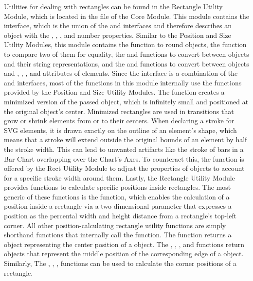 Utilities for dealing with rectangles can be found in the Rectangle
Utility Module, which is located in the  file
of the Core Module.  This module contains the  interface,
which is the union of the  and  interfaces
and therefore describes an object with the , ,
, and  number properties.  Similar to the
Position and Size Utility Modules, this module contains the
 function to round  objects, the
 function to compare two of them for equality, the
 and  functions to convert
between  objects and their string representations, and the
 and  functions to convert
between objects and , , , and
 attributes of elements.  Since the  interface
is a combination of the  and  interfaces,
most of the functions in this module internally use the functions
provided by the Position and Size Utility Modules.  The
 function creates a minimized version of the
passed  object, which is infinitely small and positioned at
the original  object's center.  Minimized rectangles are
used in transitions that grow or shrink  elements from or
to their centers.  When declaring a stroke for SVG elements, it is
drawn exactly on the outline of an element's shape, which means that a
stroke will extend outside the original bounds of an element by half
the stroke width.  This can lead to unwanted artifacts like the stroke
of bars in a Bar Chart overlapping over the Chart's Axes.  To
counteract this, the  function is offered by the
Rect Utility Module to adjust the properties of  objects to
account for a specific stroke width around them.  Lastly, the
Rectangle Utility Module provides functions to calculate specific
positions inside rectangles.  The most generic of these functions is
the  function, which enables the calculation of a
position inside a rectangle via a two-dimensional parameter that
expresses a position as the percental width and height distance from a
rectangle's top-left corner.  All other position-calculating rectangle
utility functions are simply shorthand functions that internally call
the  function.  The  function
returns a  object representing the center position of a
 object.  The , ,
, and  functions return 
objects that represent the middle position of the corresponding edge
of a  object.  Similarly, The ,
, , 
functions can be used to calculate the corner positions of a
rectangle.

